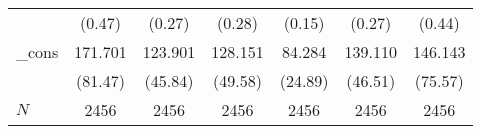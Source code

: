 {\begin{tabular}{l*{6}{c}}
            &                   (0.47)         &                   (0.27)         &                   (0.28)         &                   (0.15)         &                   (0.27)         &                   (0.44)         \\
\_cons      &                  171.701\sym{*}  &                  123.901\sym{**} &                  128.151\sym{**} &                   84.284\sym{***}&                  139.110\sym{**} &                  146.143         \\
            &                  (81.47)         &                  (45.84)         &                  (49.58)         &                  (24.89)         &                  (46.51)         &                  (75.57)         \\
\hline
\(N\)       &                     2456         &                     2456         &                     2456         &                     2456         &                     2456         &                     2456         \\
\hline\hline
\end{tabular}
}
